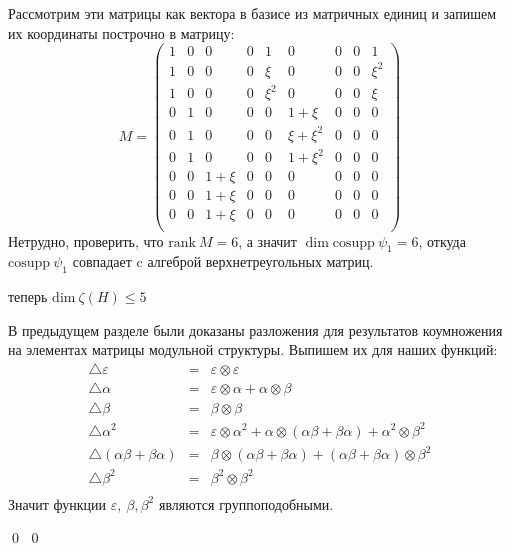 \documentclass[12pt, reqno, a4paper, oneside, notitlepage]{amsart}
\makeatletter
\theoremstyle{mytheoremstyle}
\theoremstyle{myremarkstyle}
\numberwithin{equation}{section}
\renewenvironment{proof}[1][\proofname]{\par\indent {\bfseries #1\@addpunct{.} }}{\qed}
\makeatother
\begin{document}
\begin{proof}
\begin{proof}
    Рассмотрим эти матрицы как вектора в базисе из матричных единиц и запишем их координаты построчно в матрицу: \[ M=
    \begin{pmatrix}
        1 & 0 & 0 & 0 & 1 & 0 & 0 & 0 & 1\\
        1 & 0 & 0 & 0 & \xi & 0 & 0 & 0 & \xi^2\\
        1 & 0 & 0 & 0 & \xi^2 & 0 & 0 & 0 & \xi\\
        0 & 1 & 0 & 0 & 0 & 1+\xi & 0 & 0 & 0\\
        0 & 1 & 0 & 0 & 0 & \xi+\xi^2 & 0 & 0 & 0\\
        0 & 1 & 0 & 0 & 0 & 1+\xi^2 & 0 & 0 & 0\\
        0 & 0 & 1+\xi & 0 & 0 & 0 & 0 & 0 & 0\\
        0 & 0 & 1+\xi & 0 & 0 & 0 & 0 & 0 & 0\\
        0 & 0 & 1+\xi & 0 & 0 & 0 & 0 & 0 & 0\\
    \end{pmatrix}
    \]
    Нетрудно, проверить, что $\mathrm{rank}\ M = 6$, а значит $\dim \mathrm{cosupp} \ \psi_1 = 6$, откуда $\mathrm{cosupp}\ \psi_1$ совпадает c алгеброй верхнетреугольных матриц.
    
     теперь $\mathrm{dim}\ \zeta(H) \leq 5$\par

    В предыдущем разделе были доказаны разложения для результатов коумножения на элементах матрицы модульной структуры. Выпишем их для наших функций:
    \begin{eqnarray*}
        \bigtriangleup\varepsilon &=& \varepsilon \otimes \varepsilon\\
        \bigtriangleup\alpha &=& \varepsilon \otimes \alpha + \alpha \otimes \beta\\
        \bigtriangleup\beta &=& \beta \otimes \beta\\
        \bigtriangleup\alpha^2 &=& \varepsilon \otimes \alpha^2 + \alpha \otimes (\alpha\beta+\beta\alpha) + \alpha^2 \otimes \beta^2\\
        \bigtriangleup(\alpha\beta+\beta\alpha) &=& \beta \otimes (\alpha\beta+\beta\alpha) + (\alpha\beta+\beta\alpha)\otimes \beta^2\\
        \bigtriangleup\beta^2 &=& \beta^2 \otimes \beta^2\\
    \end{eqnarray*}
    Значит функции $\varepsilon,\ \beta, \beta^2$ являются группоподобными.
    

\end{proof}
\end{proof}
\end{document}
